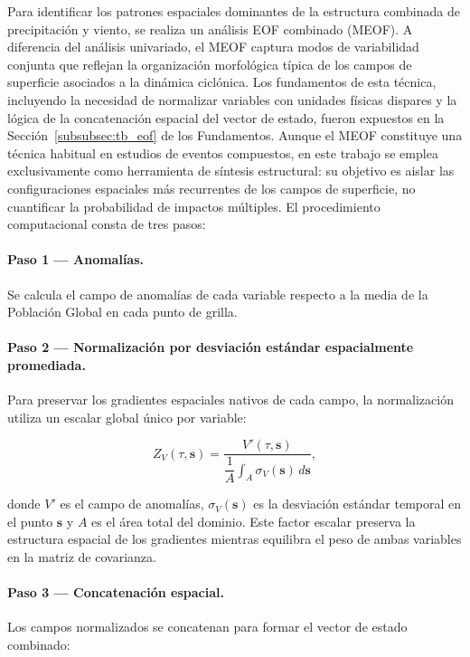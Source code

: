 Para identificar los patrones espaciales dominantes de la estructura combinada de precipitación y viento, se realiza un análisis EOF combinado (MEOF). A diferencia del análisis univariado, el MEOF captura modos de variabilidad conjunta que reflejan la organización morfológica típica de los campos de superficie asociados a la dinámica ciclónica. Los fundamentos de esta técnica, incluyendo la necesidad de normalizar variables con unidades físicas dispares y la lógica de la concatenación espacial del vector de estado, fueron expuestos en la Sección~\ref{subsubsec:tb_eof} de los Fundamentos. Aunque el MEOF constituye una técnica habitual en estudios de eventos compuestos, en este trabajo se emplea exclusivamente como herramienta de síntesis estructural: su objetivo es aislar las configuraciones espaciales más recurrentes de los campos de superficie, no cuantificar la probabilidad de impactos múltiples. El procedimiento computacional consta de tres pasos:

\paragraph{Paso 1 — Anomalías.} Se calcula el campo de anomalías de cada variable respecto a la media de la Población Global en cada punto de grilla.

\paragraph{Paso 2 — Normalización por desviación estándar espacialmente promediada.} Para preservar los gradientes espaciales nativos de cada campo, la normalización utiliza un escalar global único por variable:

\begin{equation}
    Z_{V}(\tau, \mathbf{s}) = \frac{V'(\tau, \mathbf{s})}{\dfrac{1}{A}\displaystyle\int_{A} \sigma_{V}(\mathbf{s})\, d\mathbf{s}},
\end{equation}

donde $V'$ es el campo de anomalías, $\sigma_{V}(\mathbf{s})$ es la desviación estándar temporal en el punto $\mathbf{s}$ y $A$ es el área total del dominio. Este factor escalar preserva la estructura espacial de los gradientes mientras equilibra el peso de ambas variables en la matriz de covarianza.

\paragraph{Paso 3 — Concatenación espacial.} Los campos normalizados se concatenan para formar el vector de estado combinado:

